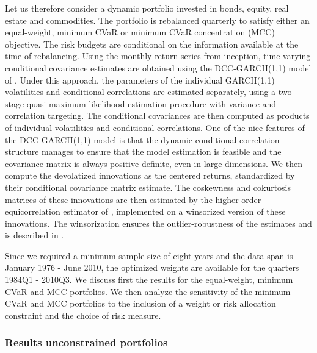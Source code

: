 \documentclass[12pt,a4paper]{article}
\begin{document}
Let us therefore consider a dynamic portfolio invested in bonds, equity, real estate and commodities. The portfolio is rebalanced quarterly to satisfy either an equal-weight, minimum CVaR or minimum CVaR concentration (MCC) objective. The risk budgets are conditional on the information available at the time of rebalancing. Using the monthly return series from inception, time-varying conditional covariance estimates are obtained using the DCC-GARCH(1,1) model of \citet{EngleDCC02}. Under this approach, the parameters of the individual GARCH(1,1) volatilities and conditional correlations are estimated separately, using a two-stage quasi-maximum likelihood estimation procedure with variance and correlation targeting. The conditional covariances are then computed as products of individual volatilities and conditional correlations. One of the nice features of the DCC-GARCH(1,1) model is that the dynamic  conditional correlation structure manages to ensure that the model
estimation is feasible and the covariance matrix is always positive definite, even in large dimensions. 
  We then compute the devolatized innovations as the centered returns, standardized by their conditional covariance matrix estimate.  The coskewness and cokurtosis matrices of these innovations are then estimated by the higher order equicorrelation estimator of \citet{MartelliniZiemann2010}, implemented on a winsorized version of these innovations. The winsorization ensures the outlier-robustness of the estimates and is described in \citet{Boudt2007}.

Since we required a minimum sample size of eight years and the data span is January 1976 - June 2010, the optimized weights are available for the quarters 1984Q1 - 2010Q3.  
We discuss first the results for the equal-weight, minimum CVaR and MCC portfolios. We then analyze the sensitivity of the minimum CVaR and MCC portfolios to the inclusion of a weight or risk allocation constraint and the choice of risk measure.


\subsubsection{Results unconstrained portfolios}
\end{document}
